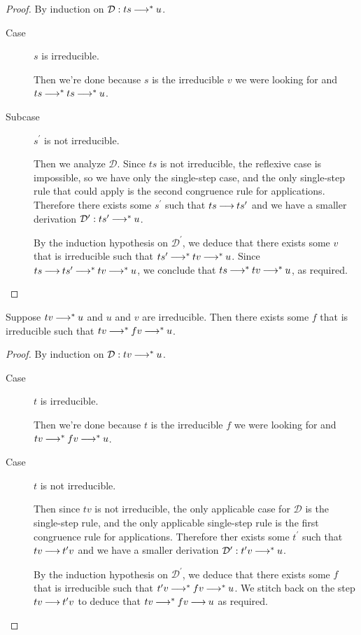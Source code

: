 \documentclass[11pt,letterpaper]{article}
\begin{document}
\begin{proof}
  By induction on $\mathcal{D} : t s \mathbin{\longrightarrow}^* u$.

  \begin{description}
    \item[Case] $s$ is irreducible.

      Then we're done because $s$ is the irreducible $v$ we were looking
      for and $t s \mathbin{\longrightarrow}^* t s \mathbin{\longrightarrow}^* u$.

    \item[Subcase] $s^\prime$ is not irreducible.

      Then we analyze $\mathcal{D}$.
      Since $t s$ is not irreducible, the reflexive case is impossible, so we
      have only the single-step case, and the only single-step rule that could
      apply is the second congruence rule for applications.
      Therefore there exists some $s^\prime$ such that $t s \mathbin{\longrightarrow} t s^\prime$
      and we have a smaller derivation $\mathcal{D}^\prime : t s^\prime
      \mathbin{\longrightarrow}^* u$.

      By the induction hypothesis on $\mathcal{D}^\prime$, we deduce that there
      exists some $v$ that is irreducible such that $t s^\prime \mathbin{\longrightarrow}^* t v
      \mathbin{\longrightarrow}^* u$.
      Since $t s \mathbin{\longrightarrow} t s^\prime \mathbin{\longrightarrow}^* t v \mathbin{\longrightarrow}^* u$,
      we conclude that $t s \mathbin{\longrightarrow}^* t v \mathbin{\longrightarrow}^* u$, as required.
  \end{description}
\end{proof}

\begin{lem}
  \label{lem:midway-reducible-2}
  Suppose $t v \mathbin{\longrightarrow}^* u$ and $u$ and $v$ are irreducible.
  Then there exists some $f$ that is irreducible such that
  $t v \mathbin{\longrightarrow}^* f v \mathbin{\longrightarrow}^* u$.
\end{lem}

\begin{proof}
  By induction on $\mathcal{D} : t v \mathbin{\longrightarrow}^* u$.

  \begin{description}
    \item[Case] $t$ is irreducible.

      Then we're done because $t$ is the irreducible $f$ we were looking for
      and $t v \mathbin{\longrightarrow}^* f v \mathbin{\longrightarrow}^* u$.

    \item[Case] $t$ is not irreducible.

      Then since $t v$ is not irreducible, the only applicable case for
      $\mathcal{D}$ is the single-step rule, and the only applicable
      single-step rule is the first congruence rule for applications.
      Therefore ther exists some $t^\prime$ such that $t v \mathbin{\longrightarrow} t^\prime v$
      and we have a smaller derivation
      $\mathcal{D}^\prime : t^\prime v \mathbin{\longrightarrow}^* u$.

      By the induction hypothesis on $\mathcal{D}^\prime$, we deduce that there
      exists some $f$ that is irreducible such that
      $t^\prime v \mathbin{\longrightarrow}^* f v \mathbin{\longrightarrow}^* u$.
      We stitch back on the step $t v \mathbin{\longrightarrow} t^\prime v$ to deduce that
      $t v \mathbin{\longrightarrow}^* f v \mathbin{\longrightarrow} u$ as required.
  \end{description}
\end{proof}
\end{document}
